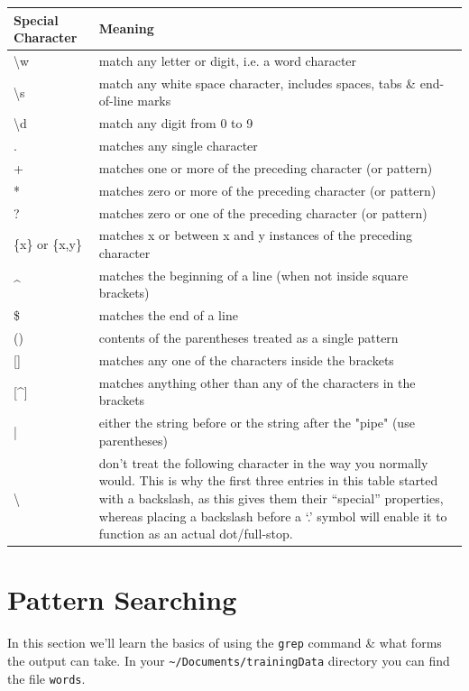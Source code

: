 \documentclass[a4paper,12pt,twoside]{memoir}
\begin{document}
\begin{center}
\renewcommand{\arraystretch}{1.6}
\begin{tabular}{|p{4cm} | p{} |}
\hline
Special Character & Meaning \\ \hline
\textbackslash w & match any letter or digit, i.e. a word character \\
\textbackslash s & match any white space character, includes spaces,
tabs \& end-of-line marks \\
\textbackslash d & match any digit from 0 to 9 \\
. & matches any single character \\
+ & matches one or more of the preceding character (or pattern) \\
\** & matches zero or more of the preceding character (or pattern) \\
? & matches zero or one of the preceding character (or pattern) \\
\{x\} or \{x,y\} & matches x or between x and y instances of the preceding
character \\
\^{} & matches the beginning of a line (when not inside square brackets) \\
\$ & matches the end of a line \\
() & contents of the parentheses treated as a single pattern \\
{[}] & matches any one of the characters inside the brackets \\
{[}\^{}] & matches anything other than any of the characters in the brackets \\
| & either the string before or the string after the "pipe" (use
parentheses) \\
\textbackslash & don't treat the following character in the way you normally would. This is why the first three entries in this table started with a backslash, as this gives them their ``special'' properties, whereas placing a backslash before a `.' symbol will enable it to function as an actual dot/full-stop. \\
\hline
\end{tabular}
\end{center}

\section{Pattern Searching}
In this section we'll learn the basics of using the \texttt{grep}
command \& what forms the output can take.
In your \texttt{\~{}/Documents/trainingData} directory you can find
the file \texttt{words}. \\
\end{document}
